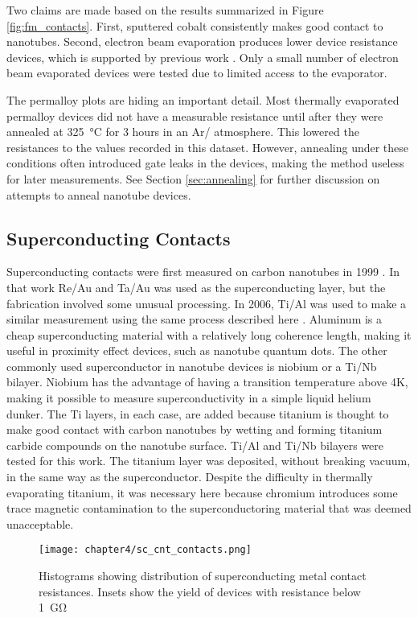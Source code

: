 Two claims are made based on the results summarized in Figure \ref{fig:fm_contacts}. First, sputtered cobalt consistently makes good contact to nanotubes. Second, electron beam evaporation produces lower device resistance devices, which is supported by previous work \cite{Churchill2012}. Only a small number of electron beam evaporated devices were tested due to limited access to the evaporator.

The permalloy plots are hiding an important detail. Most thermally evaporated permalloy devices did not have a measurable resistance until after they were annealed at \SI{325}{\celsius} for 3 hours in an Ar/ atmosphere. This lowered the resistances to the values recorded in this dataset. However, annealing under these conditions often introduced gate leaks in the devices, making the method useless for later measurements. See Section \ref{sec:annealing} for further discussion on attempts to anneal nanotube devices.

\subsection{Superconducting Contacts}

Superconducting contacts were first measured on carbon nanotubes in 1999 \cite{Kasumov1999}. In that work Re/Au and Ta/Au was used as the superconducting layer, but the fabrication involved some unusual processing. In 2006, Ti/Al was used to make a similar measurement using the same process described here \cite{JarilloHerrero2006}. Aluminum is a cheap superconducting material with a relatively long coherence length, making it useful in proximity effect devices, such as nanotube quantum dots. The other commonly used superconductor in nanotube devices is niobium or a Ti/Nb bilayer. Niobium has the advantage of having a transition temperature above 4K, making it possible to measure superconductivity in a simple liquid helium dunker. The Ti layers, in each case, are added because titanium is thought to make good contact with carbon nanotubes by wetting and forming titanium carbide compounds on the nanotube surface. Ti/Al and Ti/Nb bilayers were tested for this work. The titanium layer was deposited, without breaking vacuum, in the same way as the superconductor. Despite the difficulty in thermally evaporating titanium, it was necessary here because chromium introduces some trace magnetic contamination to the superconductoring material that was deemed unacceptable.

\begin{figure}
    \centering
    \texttt{[image: chapter4/sc\_cnt\_contacts.png]}
    \caption{Histograms showing distribution of superconducting metal contact resistances. Insets show the yield of devices with resistance below \SI{1}{\giga\ohm}}
    \label{fig:sc_contacts}
\end{figure}

